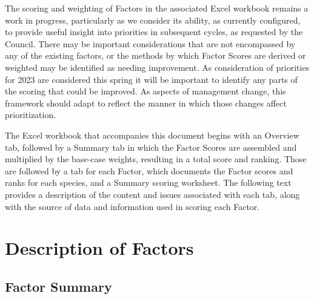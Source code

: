 \documentclass[11pt,
  english,
  a4paper,
]{article}
\begin{document}
\leavevmode\tagmcend\tagstructend\par


The scoring and weighting of Factors in the associated Excel workbook remains a work in progress, particularly as we consider its ability, as currently configured, to provide useful insight into priorities in subsequent cycles, as requested by the Council. There may be important considerations that are not encompassed by any of the existing factors, or the methods by which Factor Scores are derived or weighted may be identified as needing improvement. As consideration of priorities for 2023 are considered this spring it will be important to identify any parts of the scoring that could be improved. As aspects of management change, this framework should adapt to reflect the manner in which those changes affect prioritization.

\leavevmode\tagmcend\tagstructend\par


The Excel workbook that accompanies this document begins with an Overview tab, followed by a Summary tab in which the Factor Scores are assembled and multiplied by the base-case weights, resulting in a total score and ranking. Those are followed by a tab for each Factor, which documents the Factor scores and ranks for each species, and a Summary scoring worksheet. The following text provides a description of the content and issues associated with each tab, along with the source of data and information used in scoring each Factor.

\leavevmode\tagmcend\tagstructend\par

\newpage


\hypertarget{description-of-factors}{%
\section{Description of Factors}\label{description-of-factors}}

\leavevmode\tagmcend\tagstructend


\hypertarget{factor-summary}{%
\subsection{Factor Summary}\label{factor-summary}}
\end{document}
